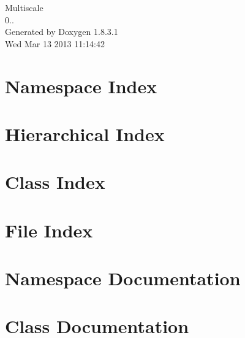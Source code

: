 \documentclass{book}
\begin{document}
\hypersetup{pageanchor=false,citecolor=blue}
\begin{titlepage}
\vspace*{7cm}
\begin{center}
{\Large Multiscale \\[1ex]\large 0.. }\\
\vspace*{1cm}
{\large Generated by Doxygen 1.8.3.1}\\
\vspace*{0.5cm}
{\small Wed Mar 13 2013 11:14:42}\\
\end{center}
\end{titlepage}
\clearemptydoublepage
{}
\tableofcontents
\clearemptydoublepage
{}
\hypersetup{pageanchor=true,citecolor=blue}
\chapter{Namespace Index}

\chapter{Hierarchical Index}

\chapter{Class Index}

\chapter{File Index}

\chapter{Namespace Documentation}



\chapter{Class Documentation}















\end{document}
